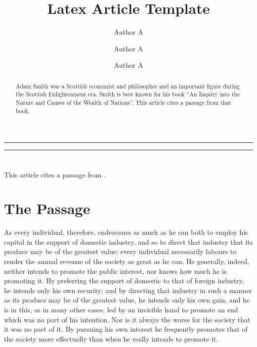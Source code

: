 \documentclass[10 pt,a4paper]{article}
\title{\LARGE Latex Article Template}
\date{}
\author[1]{Author A}
\author[2]{Author A}
\author[3]{Author A}
\affil[1]{\it\small Department of Economics, University 1, ...}
\affil[2]{\it\small Department of Statistics, University 2, ...}
\affil[3]{\it\small Department of Mathematics, University 3, ...}
\begin{document}
\maketitle
\thispagestyle{empty}

\par\noindent\rule{\textwidth}{0.4pt} %
\begin{abstract}
Adam Smith was a Scottish economist and philosopher and an important figure during the Scottish Enlightenment era. Smith is best known for his book ``An Inquiry into the Nature and Causes of the Wealth of Nations''. This article cites a passage from that book.
\end{abstract}
\par\noindent\rule{\textwidth}{0.4pt} %
\vspace*{-1.7cm} %

\section*{} %

This article cites a passage from \citet{smith1827inquiry}.
 
\section{The Passage}

As every individual, therefore, endeavours as much as he can both to employ his capital in the support of domestic industry, and so to direct that industry that its produce may be of the greatest value; every individual necessarily labours to render the annual revenue of the society as great as he can. He generally, indeed, neither intends to promote the public interest, nor knows how much he is promoting it. By preferring the support of domestic to that of foreign industry, he intends only his own security; and by directing that industry in such a manner as its produce may be of the greatest value, he intends only his own gain, and he is in this, as in many other cases, led by an invisible hand to promote an end which was no part of his intention. Nor is it always the worse for the society that it was no part of it. By pursuing his own interest he frequently promotes that of the society more effectually than when he really intends to promote it.



\end{document}
